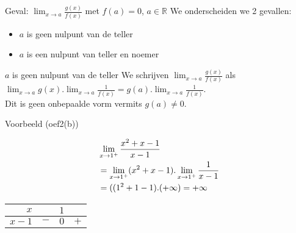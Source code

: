 \documentclass{beamer}
\begin{document}
\begin{frame}{Geval: $\displaystyle{\lim_{x \rightarrow a}}
\frac{g(x)}{f(x)}$ met $f(a) = 0$, $a \in \mathbb{R}$}
We onderscheiden we 2 gevallen:
\begin{itemize}
\item $a$ is geen nulpunt van de teller
\item $a$ is een nulpunt van teller en noemer
\end{itemize}
\begin{block}{$a$ is geen nulpunt van de teller}
We schrijven $\displaystyle{\lim_{x \rightarrow a}}
\frac{g(x)}{f(x)}$ als $\displaystyle{\lim_{x \rightarrow a}} g(x) .
\displaystyle{\lim_{x \rightarrow a}} \frac{1}{f(x)} = g(a) .
\displaystyle{\lim_{x \rightarrow a}} \frac{1}{f(x)}$.
\\Dit is geen onbepaalde vorm vermits $g(a) \neq 0$.
\end{block}
\end{frame}
\begin{frame}
\begin{exampleblock}{Voorbeeld (oef2(b))}

$$\aligned & \lim_{x  \to 1^+} \frac{x^2 + x - 1}{x-1} \\ & = \lim_{x  \to 1^+} (x^2+x-1) . \lim_{x  \to 1^+} \frac{1}{x-1} \\ & = ((1^2+1-1). (+ \infty) = + \infty \endaligned $$

\begin{center}
\begin{tabular}{r||c|c|c}$x$& &$ 1$& \\ \hline $x-1$ &
 $-$&$0$ &  $+$
\end{tabular}\end{center}
\end{exampleblock}
\end{frame}
\end{document}
